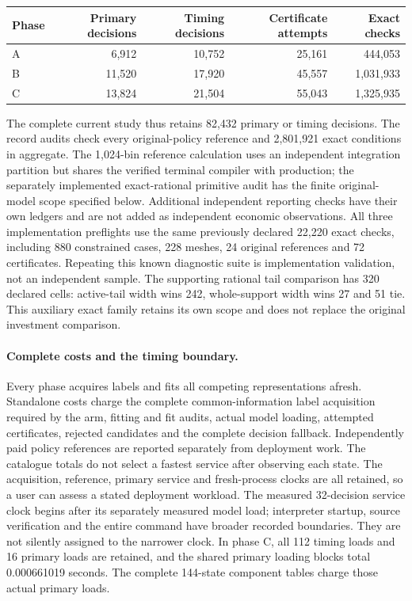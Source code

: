 \begin{center}\small
\begin{tabular}{lrrrr}
\toprule
Phase & Primary decisions & Timing decisions & Certificate attempts & Exact checks\\
\midrule
A & 6,912 & 10,752 & 25,161 & 444,053\\
B & 11,520 & 17,920 & 45,557 & 1,031,933\\
C & 13,824 & 21,504 & 55,043 & 1,325,935\\
\bottomrule
\end{tabular}
\end{center}
The complete current study thus retains 82,432 primary or timing decisions.
The record audits check every original-policy reference and 2,801,921 exact
conditions in aggregate. The 1,024-bin reference calculation uses an
independent integration partition but shares the verified terminal compiler
with production; the separately implemented exact-rational primitive audit
has the finite original-model scope specified below. Additional independent reporting checks have their
own ledgers and are not added as independent economic observations. All
three implementation preflights use the same previously declared 22,220
exact checks, including 880 constrained cases, 228 meshes, 24 original
references and 72 certificates. Repeating this known diagnostic suite is
implementation validation, not an independent sample. The supporting
rational tail comparison has 320 declared cells: active-tail width wins 242,
whole-support width wins 27 and 51 tie. This auxiliary exact family retains
its own scope and does not replace the original investment comparison.

\paragraph{Complete costs and the timing boundary.}
Every phase acquires labels and fits all competing representations afresh.
Standalone costs charge the complete common-information label acquisition
required by the arm, fitting and fit audits, actual model loading, attempted
certificates, rejected candidates and the complete decision fallback.
Independently paid policy references are reported separately from deployment
work. The catalogue totals do not select a fastest service after observing
each state. The acquisition, reference, primary service and fresh-process
clocks are all retained, so a user can assess a stated deployment workload.
The measured 32-decision service clock begins after its separately measured
model load; interpreter startup, source verification and the entire command
have broader recorded boundaries. They are not silently assigned to the
narrower clock. In phase C, all 112 timing loads and 16 primary loads are
retained, and the shared primary loading blocks total 0.000661019 seconds.
The complete 144-state component tables charge those actual primary loads.

